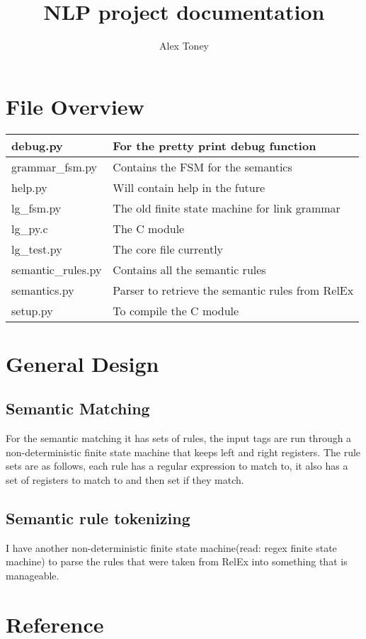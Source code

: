 \documentclass[a4paper,10pt]{report}
\title{NLP project documentation}
\author{Alex Toney}
\begin{document}
\maketitle

\section{File Overview}
\begin{tabular}{ | l | l | }
\hline
debug.py	& For the pretty print debug function\\ \hline
grammar\_fsm.py  & Contains the FSM for the semantics\\ \hline
help.py         & Will contain help in the future\\ \hline
lg\_fsm.py       & The old finite state machine for link grammar\\ \hline
lg\_py.c         & The C module\\ \hline
lg\_test.py      & The core file currently\\ \hline
semantic\_rules.py & Contains all the semantic rules\\ \hline
semantics.py    & Parser to retrieve the semantic rules from RelEx\\ \hline
setup.py        & To compile the C module\\ \hline
\end{tabular}
\section{General Design}
\subsection{Semantic Matching}

For the semantic matching it has sets of rules, the input tags are run through 
a non-deterministic finite state machine that keeps left and right registers.
The rule sets are as follows, each rule has a regular expression to match to,
it also has a set of registers to match to and then set if they match.

\subsection{Semantic rule tokenizing}
I have another non-deterministic finite state machine(read: regex finite state
machine) to parse the rules that were taken from RelEx into something that is
manageable.

\section{Reference}
\end{document}
